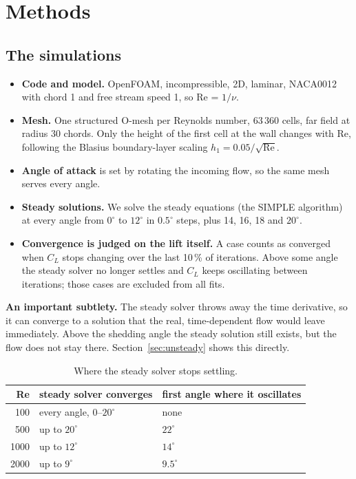 \documentclass[11pt,a4paper]{article}
\newcommand{\CL}{C_L}
\begin{document}
\section{Methods}
\label{sec:methods}

\FloatBarrier
\subsection{The simulations}

\begin{itemize}[leftmargin=*]
\item \textbf{Code and model.} OpenFOAM, incompressible, 2D, laminar, NACA0012 with
  chord 1 and free stream speed 1, so Re = $1/\nu$.
\item \textbf{Mesh.} One structured O-mesh per Reynolds number, 63\,360 cells, far
  field at radius 30 chords. Only the height of the first cell at the wall changes with
  Re, following the Blasius boundary-layer scaling $h_1 = 0.05/\sqrt{\mathrm{Re}}$.
\item \textbf{Angle of attack} is set by rotating the incoming flow, so the same mesh
  serves every angle.
\item \textbf{Steady solutions.} We solve the steady equations (the SIMPLE algorithm)
  at every angle from $0^\circ$ to $12^\circ$ in $0.5^\circ$ steps, plus 14, 16, 18 and
  $20^\circ$.
\item \textbf{Convergence is judged on the lift itself.} A case counts as converged
  when $\CL$ stops changing over the last 10\,\% of iterations. Above some angle the
  steady solver no longer settles and $\CL$ keeps oscillating between iterations; those
  cases are excluded from all fits.
\end{itemize}

\noindent
\textbf{An important subtlety.} The steady solver throws away the time derivative, so
it can converge to a solution that the real, time-dependent flow would leave
immediately. Above the shedding angle the steady solution still exists, but the flow
does not stay there. Section~\ref{sec:unsteady} shows this directly.

\begin{table}[htbp]
\centering
\caption{Where the steady solver stops settling.}
\begin{tabular}{rll}
\toprule
Re & steady solver converges & first angle where it oscillates \\
\midrule
100  & every angle, $0$--$20^\circ$ & none \\
500  & up to $20^\circ$ & $22^\circ$ \\
1000 & up to $12^\circ$ & $14^\circ$ \\
2000 & up to $9^\circ$ & $9.5^\circ$ \\
\bottomrule
\end{tabular}
\end{table}
\end{document}
